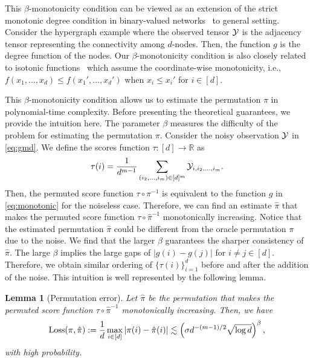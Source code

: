 \documentclass{article}
\newtheorem{lem}{Lemma}
\theoremstyle{definition}
\begin{document}
This $\beta$-monotonicity condition can be viewed as an extension of the strict monotonic degree condition in binary-valued networks~\citep{chan2014consistent} to general setting. Consider the hypergraph example where the observed tensor $\mathcal{Y}$ is the adjacency tensor representing the connectivity among $d$-nodes. Then, the function $g$ is the degree function of the nodes. Our $\beta$-monotonicity condition is also closely related to isotonic functions~\citep{han2019isotonic,pananjady2020isotonic} which assume the coordinate-wise monotonicity, i.e., $f(x_1,\ldots,x_d)\leq f(x_1',\ldots,x_d')$
when $x_i\leq x_i'$ for $i\in[d]$. %

This $\beta$-monotonicity condition allows us to estimate the permutation $\pi$  in polynomial-time complexity. Before presenting the theoretical guarantees, we provide the intuition here. The parameter $\beta$ measures the difficulty of the problem for estimating the permutation $\pi$. Consider the noisy observation $\mathcal{Y}$ in  \eqref{eq:gmd}.
We define the scores function $\tau\colon [d]\rightarrow\mathbb{R}$ as
\begin{align}\label{eq:score}
    \tau(i) = \frac{1}{d^{m-1}}\sum_{(i_2,\ldots,i_m)\in[d]^m} \mathcal{Y}_{i,i_2,\ldots,i_m}.
\end{align}
Then, the permuted score function $\tau\circ\pi^{-1}$ is equivalent to the function $g$ in \eqref{eq:monotonic} for the noiseless case.
Therefore, we can find an estimate $\hat\pi$ that makes the permuted score function $\tau\circ\hat\pi^{-1}$ monotonically increasing. Notice that the estimated permutation $\hat\pi$ could be different from the oracle permutation $\pi$ due to the noise. We find that the larger $\beta$ guarantees the sharper consistency of $\hat\pi$. The large $\beta$ implies the large gaps of $|g(i)-g(j)|$ for $i\neq j\in[d]$. Therefore, we obtain similar ordering of $\{\tau(i)\}_{i=1}^d$ before and after the addition of the noise. This intuition is well represented by the following lemma.
\begin{lem}[Permutation error]\label{lem:permute}
Let $\hat\pi$ be the permutation that makes the permuted score function $\tau\circ \hat\pi^{-1}$  monotonically increasing. Then, we have
\begin{align}
   \textup{Loss}(\pi,\hat\pi):= \frac{1}{d}\max_{i\in[d]}|\pi(i)-\hat\pi(i)|\lesssim \left(\sigma d^{-(m-1)/2}\sqrt{\log d}\right)^{\beta},
\end{align}
with high probability.
\end{lem}
\end{document}
